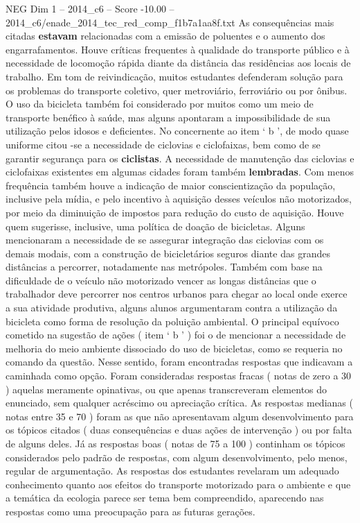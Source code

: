 \begin{textsample}{NEG Dim 1 – 2014\_c6 – Score -10.00 – 2014\_c6/enade\_2014\_tec\_red\_comp\_f1b7a1aa8f.txt}
As consequências mais citadas \textbf{estavam} relacionadas com a emissão de poluentes e o aumento dos engarrafamentos.
Houve críticas frequentes à qualidade do transporte público e à necessidade de locomoção rápida diante da distância das residências aos locais de trabalho.
Em tom de reivindicação, muitos estudantes defenderam solução para os problemas do transporte coletivo, quer metroviário, ferroviário ou por ônibus.
O uso da bicicleta também foi considerado por muitos como um meio de transporte benéfico à saúde, mas alguns apontaram a impossibilidade de sua utilização pelos idosos e deficientes.
No concernente ao item ‘ b ’, de modo quase uniforme citou -se a necessidade de ciclovias e ciclofaixas, bem como de se garantir segurança para os \textbf{ciclistas}.
A necessidade de manutenção das ciclovias e ciclofaixas existentes em algumas cidades foram também \textbf{lembradas}.
Com menos frequência também houve a indicação de maior conscientização da população, inclusive pela mídia, e pelo incentivo à aquisição desses veículos não motorizados, por meio da diminuição de impostos para redução do custo de aquisição.
Houve quem sugerisse, inclusive, uma política de doação de bicicletas.
Alguns mencionaram a necessidade de se assegurar integração das ciclovias com os demais modais, com a construção de bicicletários seguros diante das grandes distâncias a percorrer, notadamente nas metrópoles.
Também com base na dificuldade de o veículo não motorizado vencer as longas distâncias que o trabalhador deve percorrer nos centros urbanos para chegar ao local onde exerce a sua atividade produtiva, alguns alunos argumentaram contra a utilização da bicicleta como forma de resolução da poluição ambiental.
O principal equívoco cometido na sugestão de ações ( item ‘ b ’ ) foi o de mencionar a necessidade de melhoria do meio ambiente dissociado do uso de bicicletas, como se requeria no comando da questão.
Nesse sentido, foram encontradas respostas que indicavam a caminhada como opção.
Foram consideradas respostas fracas ( notas de zero a 30 ) aquelas meramente opinativas, ou que apenas transcreveram elementos do enunciado, sem qualquer acréscimo ou apreciação crítica.
As respostas medianas ( notas entre 35 e 70 ) foram as que não apresentavam algum desenvolvimento para os tópicos citados ( duas consequências e duas ações de intervenção ) ou por falta de alguns deles.
Já as respostas boas ( notas de 75 a 100 ) continham os tópicos considerados pelo padrão de respostas, com algum desenvolvimento, pelo menos, regular de argumentação.
As respostas dos estudantes revelaram um adequado conhecimento quanto aos efeitos do transporte motorizado para o ambiente e que a temática da ecologia parece ser tema bem compreendido, aparecendo nas respostas como uma preocupação para as futuras gerações.

\end{textsample}

